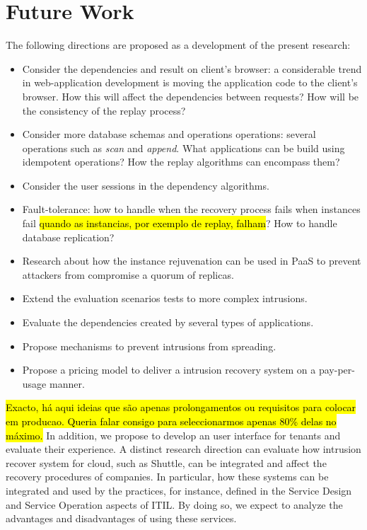 \section{Future Work}\label{sec:conclusion:future_work}
The following directions are proposed as a development of the present research:
\begin{itemize}
\item Consider the dependencies and result on client's browser: a considerable trend in web-application development is moving the application code to the client's browser. How this will affect the dependencies between requests? How will be the consistency of the replay process?
\item Consider more database schemas and operations operations: several operations such as \emph{scan} and \emph{append}. What applications can be build using idempotent operations? How the replay algorithms can encompass them?
\item Consider the user sessions in the dependency algorithms.
\item Fault-tolerance: how to handle when the recovery process fails when instances fail \hl{quando as instancias, por exemplo de replay, falham}? How to handle database replication?
\item Research about how the instance rejuvenation can be used in \ac{PaaS} to prevent attackers from compromise a quorum of replicas.
\item Extend the evaluation scenarios tests to more complex intrusions.
\item Evaluate the dependencies created by several types of applications.
\item Propose mechanisms to prevent intrusions from spreading.
\item Propose a pricing model to deliver a intrusion recovery system on a pay-per-usage manner.
\end{itemize}


\hl{Exacto, há aqui ideias que são apenas prolongamentos ou requisitos para colocar em producao. Queria falar consigo para seleccionarmos apenas 80\% delas no máximo. }
In addition, we propose to develop an user interface for tenants and evaluate their experience. A distinct research direction can evaluate how intrusion recover system for cloud, such as Shuttle, can be integrated and affect the recovery procedures of companies. In particular, how these systems can be integrated and used by the practices, for instance, defined in the Service Design and Service Operation aspects of \ac{ITIL}. By doing so, we expect to analyze the advantages and disadvantages of using these services.

